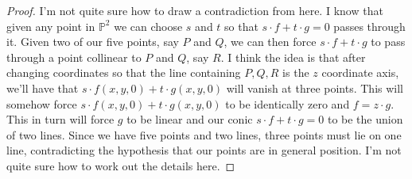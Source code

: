 \documentclass[11pt,letterpaper]{report}
\newcommand{\proj}{\mathbb{P}}
\begin{document}
\begin{enumerate}[(i)]
\begin{proof}
		\noindent I'm not quite sure how to draw a contradiction from here. I know that given any point in $\proj^2$ we can choose $s$ and $t$ so that $s\cdot f+t\cdot g=0$ passes through it. Given two of our five points, say $P$ and $Q$, we can then force $s\cdot f+t\cdot g$ to pass through a point collinear to $P$ and $Q$, say $R$. I think the idea is that after changing coordinates so that the line containing $P,Q,R$ is the $z$ coordinate axis, we'll have that $s\cdot f(x,y,0) + t\cdot g(x,y,0)$ will vanish at three points. This will somehow force $s\cdot f(x,y,0)+t\cdot g(x,y,0)$ to be identically zero and $f = z\cdot g$. This in turn will force $g$ to be linear and our conic $s\cdot f+t\cdot g = 0$ to be the union of two lines. Since we have five points and two lines, three points must lie on one line, contradicting the hypothesis that our points are in general position. I'm not quite sure how to work out the details here.
	\end{proof}
\end{enumerate}
\end{document}
